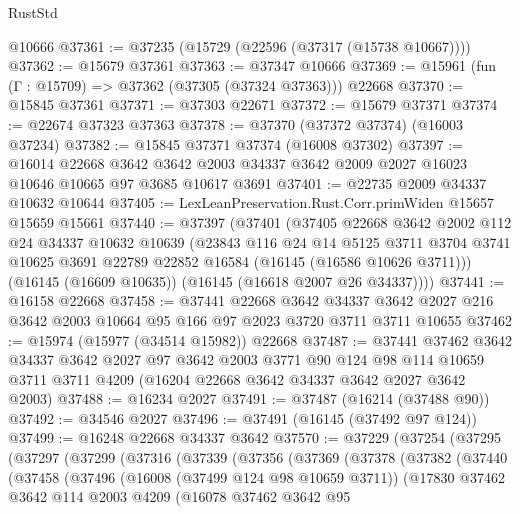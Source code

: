 \begin{lexlean}{RustStd}
\begin{coremodule}
    @10666
@37361 := @37235 (@15729 (@22596 (@37317 (@15738 @10667))))
@37362 := @15679 @37361
@37363 := @37347 @10666
@37369 := @15961 (fun (Γ : @15709) => @37362 (@37305 (@37324 @37363))) @22668
@37370 := @15845 @37361
@37371 := @37303 @22671
@37372 := @15679 @37371
@37374 := @22674 @37323 @37363
@37378 := @37370 (@37372 @37374) (@16003 @37234)
@37382 := @15845 @37371 @37374 (@16008 @37302)
@37397 := @16014
    @22668
    @3642
    @3642
    @2003
    @34337
    @3642
    @2009
    @2027
    @16023
    @10646
    @10665
    @97
    @3685
    @10617
    @3691
@37401 := @22735 @2009 @34337 @10632 @10644
@37405 := LexLeanPreservation.Rust.Corr.primWiden @15657 @15659 @15661
@37440 := @37397
    (@37401
      (@37405
        @22668
        @3642
        @2002
        @112
        @24
        @34337
        @10632
        @10639
        (@23843
          @116
          @24
          @14
          @5125
          @3711
          @3704
          @3741
          @10625
          @3691
          @22789
          @22852
          @16584
          (@16145 (@16586 @10626 @3711)))
        (@16145 (@16609 @10635))
        (@16145 (@16618 @2007 @26 @34337))))
@37441 := @16158 @22668
@37458 := @37441
    @22668
    @3642
    @34337
    @3642
    @2027
    @216
    @3642
    @2003
    @10664
    @95
    @166
    @97
    @2023
    @3720
    @3711
    @3711
    @10655
@37462 := @15974 (@15977 (@34514 @15982)) @22668
@37487 := @37441
    @37462
    @3642
    @34337
    @3642
    @2027
    @97
    @3642
    @2003
    @3771
    @90
    @124
    @98
    @114
    @10659
    @3711
    @3711
    @4209
    (@16204 @22668 @3642 @34337 @3642 @2027 @3642 @2003)
@37488 := @16234 @2027
@37491 := @37487 (@16214 (@37488 @90))
@37492 := @34546 @2027
@37496 := @37491 (@16145 (@37492 @97 @124))
@37499 := @16248 @22668 @34337 @3642
@37570 := @37229
    (@37254
      (@37295
        (@37297
          (@37299
            (@37316
              (@37339
                (@37356
                  (@37369
                    (@37378
                      (@37382
                        (@37440
                          (@37458
                            (@37496
                              (@16008 (@37499 @124 @98 @10659 @3711))
                              (@17830
                                @37462
                                @3642
                                @114
                                @2003
                                @4209
                                (@16078
                                  @37462
                                  @3642
                                  @95

\end{coremodule}
\end{lexlean}
